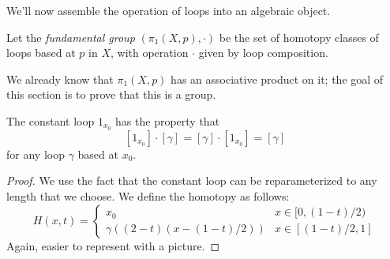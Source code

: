 \begin{doubledtuftepage}
We'll now assemble the operation of loops into an algebraic object.  
	\begin{definition}
		Let the \emph{fundamental group} $(\pi_1(X, p), \cdot) $ be the set of homotopy classes of loops based at $p$ in $X$, with operation $\cdot$ given by loop composition. 
	\end{definition}
We already know that $\pi_1(X, p)$ has an associative product on it; the goal of this section is to prove that this is a group. 
\begin{claim}
	The constant loop $1_{x_0}$ has the property that
	\[[1_{x_0}]\cdot [\gamma]=[\gamma]\cdot [1_{x_0}]=[\gamma]\]
	for any loop $\gamma$ based at $x_0$. 
\end{claim}
\begin{proof}
	We use the fact that the constant loop can be reparameterized to any length that we choose. We define the homotopy as follows:
	\[
		H(x,  t)=\left\{\begin{array}{cc}
		                	x_0 & x\in [0, (1-t)/2)\\
		                	\gamma((2-t)(x-(1-t)/2)) & x\in [(1-t)/2,  1]
		                \end{array}\right.
	\]
	Again,  easier to represent with a picture. 

\end{proof}


\end{doubledtuftepage}
